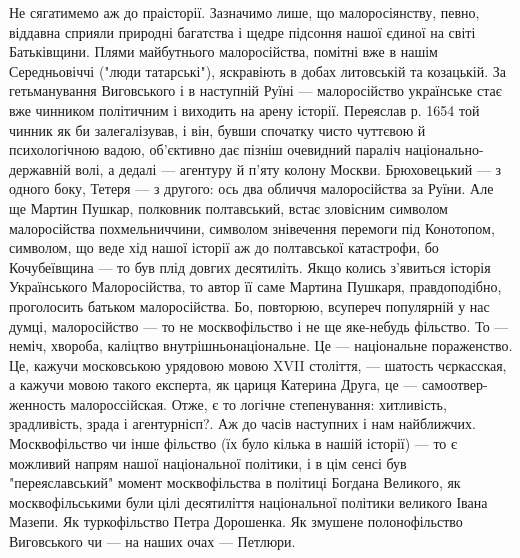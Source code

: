 Не сягатимемо аж до праісторії. Зазначимо лише, що малоросіянству, певно,
віддавна сприяли природні багатства і щедре підсоння нашої єдиної на світі
Батьківщини. Плями майбутнього малоросійства, помітні вже в нашім Середньовіччі
("люди татарські"), яскравіють в добах литовській та козацькій. За
гетьманування Виговського і в наступній Руїні — малоросійство українське стає
вже чинником політичним і виходить на арену історії. Переяслав р. 1654 той
чинник як би залегалізував, і він, бувши спочатку чисто чуттєвою й
психологічною вадою, об'єктивно дає пізніш очевидний параліч
національно-державній волі, а дедалі — агентуру й п'яту колону Москви.
Брюховецький — з одного боку, Тетеря — з другого: ось два обличчя малоросійства
за Руїни. Але ще Мартин Пушкар, полковник полтавський, встає зловісним символом
малоросійства похмельниччини, символом знівечення перемоги під Конотопом,
символом, що веде хід нашої історії аж до полтавської катастрофи, бо
Кочубеївщина — то був плід довгих десятиліть. Якщо колись з'явиться історія
Українського Малоросійства, то автор її саме Мартина Пушкаря, правдоподібно,
проголосить батьком малоросійства. Бо, повторюю, всупереч популярній у нас
думці, малоросійство — то не москвофільство і не ще яке-небудь фільство. То —
неміч, хвороба, каліцтво внутрішньонаціональне. Це — національне пораженство.
Це, кажучи московською урядовою мовою XVII століття, — шатость чєркасская, а
кажучи мовою такого експерта, як цариця Катерина Друга, це — самоотвер-женность
малороссійская. Отже, є то логічне степенування: хитливість, зрадливість, зрада
і агентурнісп?. Аж до часів наступних і нам найближчих. Москвофільство чи інше
фільство (їх було кілька в нашій історії) — то є можливий напрям нашої
національної політики, і в цім сенсі був "переяславський" момент москвофільства
в політиці Богдана Великого, як москвофільськими були цілі десятиліття
національної політики великого Івана Мазепи. Як туркофільство Петра Дорошенка.
Як змушене полонофільство Виговського чи — на наших очах — Петлюри.

